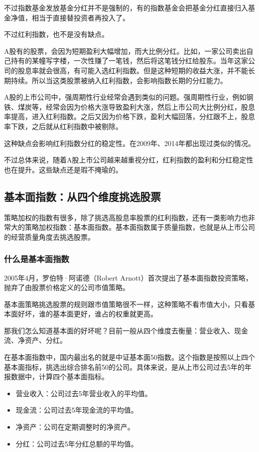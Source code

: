 不过指数基金发放基金分红并不是强制的，有的指数基金会把基金分红直接归入基金净值，相当于直接替投资者再投入了。

不过红利指数，也不是没有缺点。

A股有的股票，会因为短期盈利大幅增加，而大比例分红。比如，一家公司卖出自己持有的某幢写字楼，一次性赚了一笔钱，然后将这笔钱分红给股东。当年这家公司的股息率就会很高，有可能入选红利指数。但是这种短期的收益大涨，并不能长期持续。所以当这类股票被纳入红利指数，会影响指数长期的分红能力。

A股的上市公司中，强周期性行业经常会遇到类似的问题。强周期性行业，例如钢铁、煤炭等，经常会因为价格大涨导致盈利大涨，然后上市公司大比例分红，股息率提高，进入红利指数。之后又因为价格下跌，盈利大幅回落，分红跟不上，股息率下跌，之后就从红利指数中被剔除。

这种缺点会影响红利指数分红的稳定性。在2009年、2014年都出现过类似的情况。

不过总体来说，随着A股上市公司越来越重视分红，红利指数的盈利和分红稳定性也在提升。这些缺点还是瑕不掩瑜的。

\subsection{基本面指数：从四个维度挑选股票}
策略加权的指数有很多，除了挑选高股息率股票的红利指数，还有一类影响力也非常大的策略加权指数：基本面指数。基本面指数属于质量指数，也就是从上市公司的经营质量角度去挑选股票。

\subsubsection{什么是基本面指数}

2005年4月，罗伯特·阿诺德（Robert Arnott）首次提出了基本面指数投资策略，抛弃了由股票价格定义的公司市值策略。

基本面策略挑选股票的规则跟市值策略很不一样，这种策略不看市值大小，只看基本面好坏，谁的基本面更好，谁占的权重就更高。

那我们怎么知道基本面的好坏呢？目前一般从四个维度去衡量：营业收入、现金流、净资产、分红。

在基本面指数中，国内最出名的就是中证基本面50指数。这个指数是按照以上四个基本面指标，挑选出综合排名前50的公司。具体来说，是从上市公司过去5年的年报数据中，计算四个基本面指标。

\begin{itemize}
\item 营业收入：公司过去5年营业收入的平均值。
\item 现金流：公司过去5年现金流的平均值。
\item 净资产：公司在定期调整时的净资产。
\item 分红：公司过去5年分红总额的平均值。
\end{itemize}

